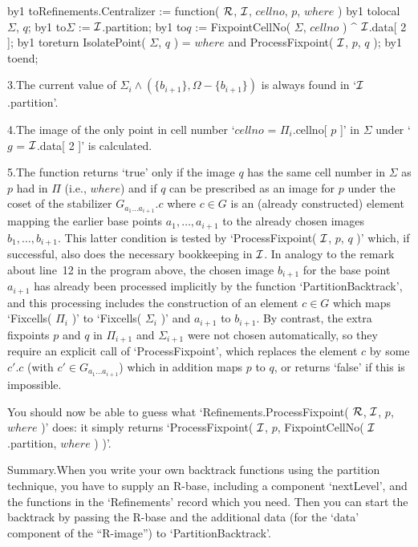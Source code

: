 {\newcount\lineno%
 \def\){\advance\lineno by1 \begingroup\obeylines\cloparen%
        \hbox to\manindent{\hfil $\scriptstyle\the\lineno$\enspace}}%

\)Refinements.Centralizer := function( ${\cal R}$, ${\cal I}$, $cellno$, $p$, $where$ )
\)local \ $\Sigma$,  $q$;
\)\quad $\Sigma$ := ${\cal I}$.partition;
\)\quad $q$ := FixpointCellNo( $\Sigma$, $cellno$ ) ^ ${\cal I}$.data[ 2 ];
\)\quad return IsolatePoint( $\Sigma$, $q$ ) = $where$ %
           and ProcessFixpoint( ${\cal I}$, $p$, $q$ );
\)end;
  \vadjust{\allowbreak}%

}%
3.\enspace    The  current    value   of   $\Sigma_i\wedge  (\{b_{i+1}\},
\Omega-\{b_{i+1}\})$ is always found in `${\cal I}$.partition'.

4.\enspace  The image of  the  only  point  in  cell number  `$cellno$  =
$\Pi_i$.cellno[ $p$  ]' in $\Sigma$  under `$g$ = ${\cal I}$.data[ 2 ]' is
calculated.

5.\enspace The function returns `true' only if the image $q$ has the same
cell number in $\Sigma$ as  $p$ had in  $\Pi$ (i.e., $where$) and if  $q$
can be prescribed as  an image for $p$  under the coset of the stabilizer
$G_{a_1\ldots a_{i+1}}.c$ where $c\in    G$ is an  (already  constructed)
element  mapping the earlier  base   points $a_1,\ldots,a_{i+1}$ to   the
already  chosen  images $b_1,\ldots,b_{i+1}$.  This  latter condition  is
tested by `ProcessFixpoint( ${\cal I}$, $p$,  $q$ )' which, if successful, also
does the  necessary bookkeeping in ${\cal I}$. In  analogy to  the remark about
line~12 in  the program above, the   chosen image $b_{i+1}$  for the base
point $a_{i+1}$ has  already  been processed implicitly by  the  function
`PartitionBacktrack', and this processing includes the construction of an
element  $c\in G$ which    maps   `Fixcells( $\Pi_i$  )'  to   `Fixcells(
$\Sigma_i$  )'  and  $a_{i+1}$   to $b_{i+1}$.  By  contrast,   the extra
fixpoints $p$  and $q$ in  $\Pi_{i+1}$ and $\Sigma_{i+1}$ were not chosen
automatically,   so they require an  explicit  call of `ProcessFixpoint',
which replaces the element  $c$ by some  $c'.c$ (with $c'\in G_{a_1\ldots
a_{i+1}}$) which in addition maps $p$ to  $q$, or returns `false' if this
is impossible.

You should now be able to  guess what `Refinements.ProcessFixpoint( ${\cal R}$,
${\cal I}$, $p$, $where$   )' does: it  simply returns  `ProcessFixpoint( ${\cal I}$,
$p$, FixpointCellNo( ${\cal I}$.partition, $where$ ) )'.

\medskip
{\bsf  Summary.}\quad When you write  your  own backtrack functions using
the  partition technique,  you  have  to  supply  an R-base, including  a
component `nextLevel', and   the  functions in the   `Refinements' record
which  you need. Then  you can start  the backtrack by passing the R-base
and the additional data (for the  `data' component of the ``R-image'') to
`PartitionBacktrack'.

